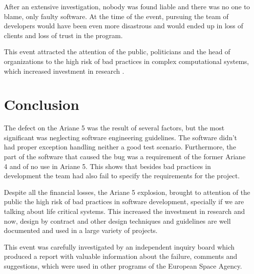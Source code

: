 \documentclass[
12pt, %
a4paper, %
oneside, %
headinclude,footinclude, %
BCOR5mm, %
]{scrartcl}
\begin{document}
After an extensive investigation, nobody was found liable and there was no one to blame, only faulty software. At the time of the event, pursuing the team of developers would have been even more disastrous and would ended up in loss of clients and loss of trust in the program.

This event attracted the attention of the public, politicians and the head of organizations to the high risk of bad practices in complex computational systems, which increased investment in research \cite{lessonsofAriane:Jean}.



\section{Conclusion}

The defect on the Ariane 5 was the result of several factors, but the most significant was neglecting software engineering guidelines. The software didn't had proper exception handling neither a good test scenario. Furthermore, the part of the software that caused the bug was a requirement of the former Ariane 4 and of no use in Ariane 5. This shows that besides bad practices in development the team had also fail to specify the requirements for the project.

Despite all the financial losses, the Ariane 5 explosion, brought to attention of the public the high risk of bad practices in software development, specially if we are talking about life critical systems. This increased the investment in research and now, design by contract\cite{designByContract:wikipedia} and other design techniques and guidelines are well documented and used in a large variety of projects.

This event was carefully investigated by an independent inquiry board which produced a report with valuable information about the failure, comments and suggestions, which were used in other programs of the European Space Agency.



\renewcommand{\refname}{\spacedlowsmallcaps{References}} %


\nocite{bugandcrash:Gleick}
\nocite{floatingError:Praksh}

\end{document}
